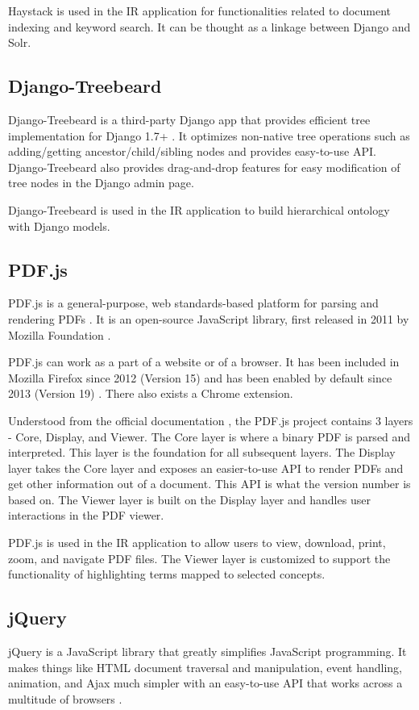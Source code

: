 Haystack is used in the IR application for functionalities related to document indexing and keyword search. It can be thought as a linkage between Django and Solr.

\subsection{Django-Treebeard}
Django-Treebeard is a third-party Django app that provides efficient tree implementation for Django 1.7+ \cite{Treebeard}. It optimizes non-native tree operations such as adding/getting ancestor/child/sibling nodes and provides easy-to-use API. Django-Treebeard also provides drag-and-drop features for easy modification of tree nodes in the Django admin page.

Django-Treebeard is used in the IR application to build hierarchical ontology with Django models. 

\subsection{PDF.js}
PDF.js is a general-purpose, web standards-based platform for parsing and rendering PDFs \cite{PDFjsDoc}. It is an open-source JavaScript library, first released in 2011 by Mozilla Foundation \cite{PDFjsWiki}.

PDF.js can work as a part of a website or of a browser. It has been included in Mozilla Firefox since 2012 (Version 15) and has been enabled by default since 2013 (Version 19) \cite{PDFjsWiki}. There also exists a Chrome extension.

Understood from the official documentation \cite{PDFjsDoc}, the PDF.js project contains 3 layers - Core, Display, and Viewer. The Core layer is where a binary PDF is parsed and interpreted. This layer is the foundation for all subsequent layers. The Display layer takes the Core layer and exposes an easier-to-use API to render PDFs and get other information out of a document. This API is what the version number is based on. The Viewer layer is built on the Display layer and handles user interactions in the PDF viewer.

PDF.js is used in the IR application to allow users to view, download, print, zoom, and navigate PDF files. The Viewer layer is customized to support the functionality of highlighting terms mapped to selected concepts.

\subsection{jQuery}
jQuery is a JavaScript library that greatly simplifies JavaScript programming. It makes things like HTML document traversal and manipulation, event handling, animation, and Ajax much simpler with an easy-to-use API that works across a multitude of browsers \cite{jQuery}.

